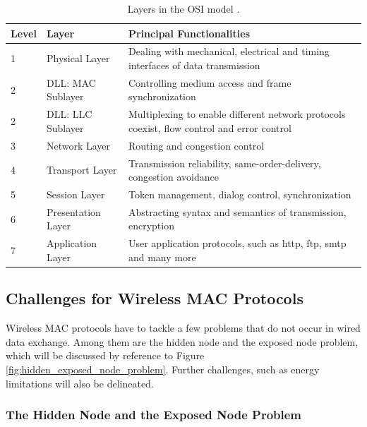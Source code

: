 \begin{table}[b]
	\begin{center}
		\begin{tabular}{|p{1cm}|p{4cm}|p{8cm}|}
			\hline
				Level & Layer & Principal Functionalities \\
			\hline
				1 & Physical Layer & Dealing with mechanical, electrical and timing interfaces of data transmission  \\
				2 & DLL: MAC Sublayer & Controlling medium access and frame synchronization \\
				2 & DLL: LLC Sublayer & Multiplexing to enable different network protocols coexist, flow control and error control \\
				3 & Network Layer & Routing and congestion control \\
				4 &Transport Layer & Transmission reliability, same-order-delivery, congestion avoidance  \\
				5 & Session Layer & Token management, dialog control, synchronization \\
				6 & Presentation Layer & Abstracting syntax and semantics of transmission, encryption \\
				7 & Application Layer & User application protocols, such as http, ftp, smtp and many more \\
			\hline
		\end{tabular}\caption[Layers in the OSI model.]{Layers in the OSI model \cite{osi}.} \label{tab:osi-layers}
	\end{center}
\end{table}

\subsection{Challenges for Wireless MAC Protocols}

Wireless MAC protocols have to tackle a few problems that do not occur in wired data exchange. Among them are the hidden node and the exposed node problem, which will be discussed by reference to Figure \ref{fig:hidden_exposed_node_problem}. Further challenges, such as energy limitations will also be delineated.

\subsubsection{The Hidden Node and the Exposed Node Problem}

